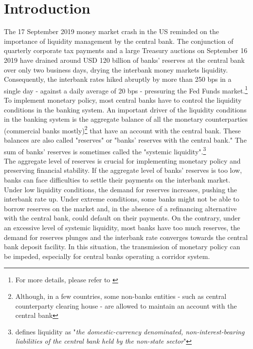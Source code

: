 \section{Introduction}
\label{sec:introduction}

The 17 September 2019 money  market crash in the US reminded  on the importance of
liquidity  management  by the  central  bank.   The conjunction  of  quarterly
corporate tax payments and a large Treasury auctions on September 16 2019 have
drained around  USD 120 billion  of banks' reserves  at the central  bank over
only    two   business    days,   drying    the   interbank    money   markets
liquidity. Consequently, the  interbank rates hiked abruptly by  more than 250
bps in a single  day - against a daily average of 20  bps - pressuring the Fed
Funds market.\footnote{For more details, please refer to \cite{Anbil2020}}\\

To implement monetary policy, most central banks have to control the liquidity
conditions  in the  banking  system.   An important  driver  of the  liquidity
conditions in the banking system is  the aggregate balance of all the monetary
counterparties   (commercial  banks   mostly)\footnote{Although,   in  a   few
countries, some  non-banks entities  - such  as central  counterparty clearing
house - are allowed to maintain an account with the central bank} that have an
account with the  central bank.  These balances are also  called "reserves" or
"banks'  reserves with  the  central bank."   The sum  of  banks' reserves  is
sometimes  called the  "systemic liquidity".\footnote{\cite{Gray2008}  defines
liquidity  as "\emph{the  domestic-currency denominated,  non-interest-bearing
liabilities of the central bank held by the non-state sector}"}\\

The aggregate  level of reserves  is crucial for implementing  monetary policy
and preserving financial stability.  If the aggregate level of banks' reserves
is  too low,  banks can  face  difficulties to  settle their  payments on  the
interbank  market. Under  low liquidity  conditions, the  demand for  reserves
increases, pushing the interbank rate up. Under extreme conditions, some banks
might not be  able to borrow reserves on  the market and, in the  absence of a
refinancing  alternative  with  the  central  bank,  could  default  on  their
payments.  On  the contrary, under  an excessive level of  systemic liquidity,
most banks  have too much  reserves, the demand  for reserves plunges  and the
interbank rate converges  towards the central bank deposit  facility.  In this
situation, the transmission of monetary  policy can be impeded, especially for
central banks operating a corridor system. \\

